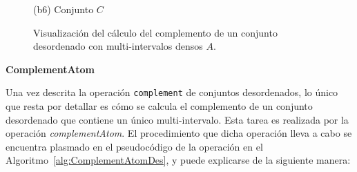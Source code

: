 \begin{figure}[H]
\begin{minipage}{0.31\textwidth}
        \caption*{    \centering (b6) Conjunto $C$}
    \end{minipage}
    
    \caption{Visualización del cálculo del complemento de un conjunto desordenado con multi-intervalos densos $A$.}
    \label{fig:complemento}
\end{figure}


\textbf{ComplementAtom}

Una vez descrita la operación \texttt{complement} de conjuntos desordenados, lo único que resta por detallar es cómo se calcula el complemento de un conjunto desordenado que contiene un único multi-intervalo. Esta tarea es realizada por la operación \textit{complementAtom}.  
El procedimiento que dicha operación lleva a cabo se encuentra plasmado en el pseudocódigo de la operación en el Algoritmo~\ref{alg:ComplementAtomDes}, y puede explicarse de la siguiente manera:

